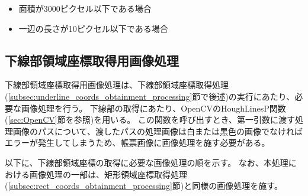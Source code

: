 \begin{itemize}
    \item 面積が3000ピクセル以下である場合
    \item 一辺の長さが10ピクセル以下である場合
\end{itemize}






\subsection{下線部領域座標取得用画像処理}\label{subsec:image_processing_for_underline_coords_obtainment}
下線部領域座標取得用画像処理は、下線部領域座標取得処理(\ref{subsec:underline_coords_obtainment_processing}節で後述)の実行にあたり、必要な画像処理を行う。
下線部の取得にあたり、OpenCVのHoughLinesP関数(\ref{sec:OpenCV}節を参照)を用いる。
この関数を呼び出すとき、第一引数に渡す処理画像のパスについて、渡したパスの処理画像は白または黒色の画像でなければエラーが発生してしまうため、帳票画像に画像処理を施す必要がある。

以下に、下線部領域座標の取得に必要な画像処理の順を示す。
なお、本処理における画像処理の一部は、矩形領域座標取得処理(\ref{subsec:rect_coords_obtainment_processing}節)と同様の画像処理を施す。

